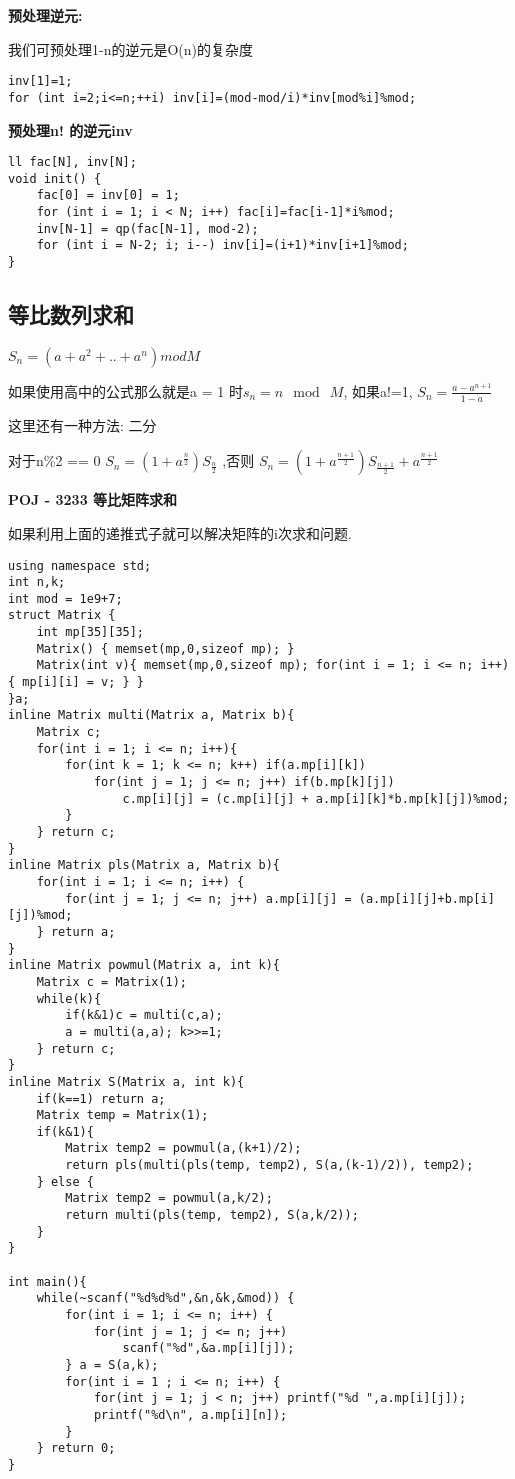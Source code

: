 {\bfseries 预处理逆元:}

我们可预处理1-n的逆元是O(n)的复杂度

\begin{lstlisting}
inv[1]=1;
for (int i=2;i<=n;++i) inv[i]=(mod-mod/i)*inv[mod%i]%mod;
\end{lstlisting}

{\bfseries 预处理n! 的逆元inv}
\begin{lstlisting}
ll fac[N], inv[N];
void init() {
    fac[0] = inv[0] = 1;
    for (int i = 1; i < N; i++) fac[i]=fac[i-1]*i%mod;
    inv[N-1] = qp(fac[N-1], mod-2);
    for (int i = N-2; i; i--) inv[i]=(i+1)*inv[i+1]%mod;
}
\end{lstlisting}

\subsection{等比数列求和}

$S_n = (a + a^2 + .. + a^n) mod M$

如果使用高中的公式那么就是a = 1 时$s_n = n \mod \ M$,  如果a!=1, $S_n = \frac{a - a ^{n+1}}{1 - a}$

这里还有一种方法: 二分

对于n\%2 == 0 $S_n = (1 + a ^{\frac{n}{2}}) S_{\frac{n}{2}}$ ,否则 $S_n = (1 + a^{\frac{n+1}{2}})S_{\frac{n+1}{2}} + a^{\frac{n+1}{2}}$

{\bfseries POJ - 3233 等比矩阵求和}

如果利用上面的递推式子就可以解决矩阵的i次求和问题.

\begin{lstlisting}
using namespace std;
int n,k;
int mod = 1e9+7;
struct Matrix {
    int mp[35][35];
    Matrix() { memset(mp,0,sizeof mp); }
    Matrix(int v){ memset(mp,0,sizeof mp); for(int i = 1; i <= n; i++){ mp[i][i] = v; } }
}a;
inline Matrix multi(Matrix a, Matrix b){
    Matrix c;
    for(int i = 1; i <= n; i++){
        for(int k = 1; k <= n; k++) if(a.mp[i][k])
            for(int j = 1; j <= n; j++) if(b.mp[k][j])
                c.mp[i][j] = (c.mp[i][j] + a.mp[i][k]*b.mp[k][j])%mod;
        }
    } return c;
}
inline Matrix pls(Matrix a, Matrix b){
    for(int i = 1; i <= n; i++) {
        for(int j = 1; j <= n; j++) a.mp[i][j] = (a.mp[i][j]+b.mp[i][j])%mod;
    } return a;
}
inline Matrix powmul(Matrix a, int k){
    Matrix c = Matrix(1);
    while(k){
        if(k&1)c = multi(c,a);
        a = multi(a,a); k>>=1;
    } return c;
}
inline Matrix S(Matrix a, int k){
    if(k==1) return a;
    Matrix temp = Matrix(1);
    if(k&1){
        Matrix temp2 = powmul(a,(k+1)/2);
        return pls(multi(pls(temp, temp2), S(a,(k-1)/2)), temp2);
    } else {
        Matrix temp2 = powmul(a,k/2);
        return multi(pls(temp, temp2), S(a,k/2));
    }
}

int main(){
    while(~scanf("%d%d%d",&n,&k,&mod)) {
        for(int i = 1; i <= n; i++) {
            for(int j = 1; j <= n; j++) 
                scanf("%d",&a.mp[i][j]);
        } a = S(a,k);
        for(int i = 1 ; i <= n; i++) {
            for(int j = 1; j < n; j++) printf("%d ",a.mp[i][j]);
            printf("%d\n", a.mp[i][n]);
        }
    } return 0;
}
\end{lstlisting}


